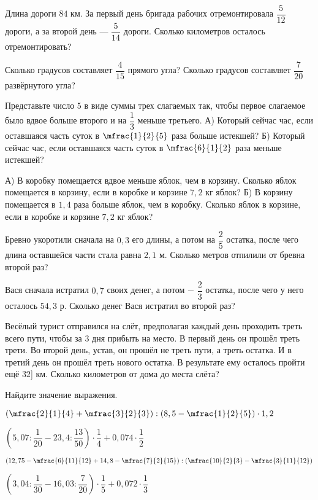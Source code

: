 \begin{class}[number=6]
	\begin{listofex}
		\item Длина дороги \(84\) км. За первый день бригада рабочих отремонтировала \(\dfrac{5}{12}\) дороги, а за второй день --- \(\dfrac{5}{14}\) дороги. Сколько километров осталось отремонтировать?
		\item Сколько градусов составляет \(\dfrac{4}{15}\) прямого угла? Сколько градусов составляет \(\dfrac{7}{20}\) развёрнутого угла?
		\item Представьте число \(5\) в виде суммы трех слагаемых так, чтобы первое слагаемое было вдвое больше второго и на \(\dfrac{1}{3}\) меньше третьего.
		А) Который сейчас час, если оставшаяся часть суток в \(\mfrac{1}{2}{5}\) раза больше истекшей? Б) Который сейчас час, если оставшаяся часть суток в \(\mfrac{6}{1}{2}\) раза меньше истекшей?
		\item А) В коробку помещается вдвое меньше яблок, чем в корзину. Сколько яблок помещается в корзину, если в коробке и корзине \(7,2\) кг яблок? Б) В корзину помещается в \(1,4\) раза больше яблок, чем в коробку. Сколько яблок в корзине, если в коробке и корзине \( 7,2\) кг яблок?
		\item Бревно укоротили сначала на \(0,3\) его длины, а потом на \(\dfrac{2}{5}\)  остатка, после чего длина оставшейся части стала равна \(2,1\) м. Сколько метров отпилили от бревна второй раз?
		\item Вася сначала истратил \(0,7\) своих денег, а потом − \(\dfrac{2}{3}\) остатка, после чего у него осталось \(54,3\) р. Сколько денег Вася истратил во второй раз?
		\item Весёлый турист отправился на слёт, предполагая каждый день проходить треть всего пути, чтобы за \(3\) дня прибыть на место. В первый день он прошёл треть трети. Во второй день, устав, он прошёл не треть пути, а треть остатка. И в третий день он прошёл треть нового остатка. В результате ему осталось пройти ещё \(32\)] км. Сколько километров от дома до места слёта?
		\item Найдите значение выражения.
		\begin{enumcols}[itemcolumns=2]
			\item \(\left(\mfrac{2}{1}{4}+\mfrac{3}{2}{3}\right):\left(8,5-\mfrac{1}{2}{5}\right) \cdot 1,2\)
			\item \(\left(5,07:\dfrac{1}{20}-23,4: \dfrac{13}{50}\right) \cdot \dfrac{1}{4} + 0,074 \cdot \dfrac{1}{2}\)
			\item \( \left( 12,75 - \mfrac{6}{11}{12} + 14,8 - \mfrac{7}{2}{15}\right): \left( \mfrac{10}{2}{3} - \mfrac{3}{11}{12} \right) \)
			\item \(\left(3,04:\dfrac{1}{30}-16,03: \dfrac{7}{20}\right) \cdot \dfrac{1}{5} + 0,072 \cdot \dfrac{1}{3}\)
		\end{enumcols}
	\end{listofex}
\end{class}
%
%
%	
